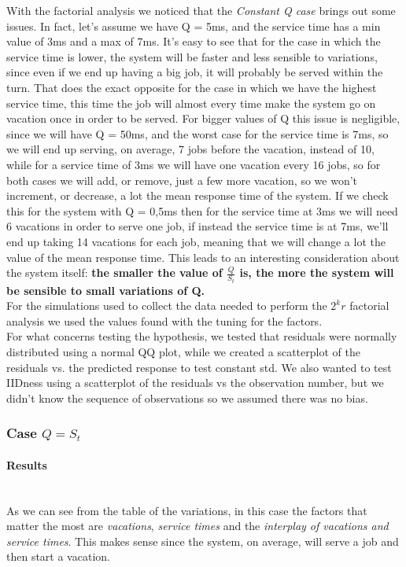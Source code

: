 \documentclass{article}
\begin{document}
        With the factorial analysis we noticed that the \textit{Constant Q case} brings out some issues. In fact, let's assume we have Q = 5ms, and the service time has a min value of 3ms and a max of 7ms. It's easy to see that for the case in which the service time is lower, the system will be faster and less sensible to variations, since even if we end up having a big job, it will probably be served within the turn. That does the exact opposite for the case in which we have the highest service time, this time the job will almost every time make the system go on vacation once in order to be served. For bigger values of Q this issue is negligible, since we will have Q = 50ms, and the worst case for the service time is 7ms, so we will end up serving, on average, 7 jobs before the vacation, instead of 10, while for a service time of 3ms we will have one vacation every 16 jobs, so for both cases we will add, or remove, just a few more vacation, so we won't increment, or decrease, a lot the mean response time of the system. If we check this for the system with Q = 0,5ms then for the service time at 3ms we will need 6 vacations in order to serve one job, if instead the service time is at 7ms, we'll end up taking 14 vacations for each job, meaning that we will change a lot the value of the mean response time. This leads to an interesting consideration about the system itself: \textbf{the smaller the value of $\frac{Q}{S_t}$ is, the more the system will be sensible to small variations of Q.} \\
        
        For the simulations used to collect the data needed to perform the $2^k r$ factorial analysis we used the values found with the tuning for the factors.\\
        
        For what concerns testing the hypothesis, we tested that residuals were normally distributed using a normal QQ plot, while we created a scatterplot of the residuals vs. the predicted response to test constant std. We also wanted to test IIDness using a scatterplot of the residuals vs the observation number, but we didn't know the sequence of observations so we assumed there was no bias.
    
        \newpage 
        \subsubsection{Case $Q = S_t$}
                
            \paragraph{Results} \hfill \\
                As we can see from the table of the variations, in this case the factors that matter the most are \textit{vacations}, \textit{service times} and the \textit{interplay of vacations and service times}.
                This makes sense since the system, on average, will serve a job and then start a vacation.
                
\end{document}
